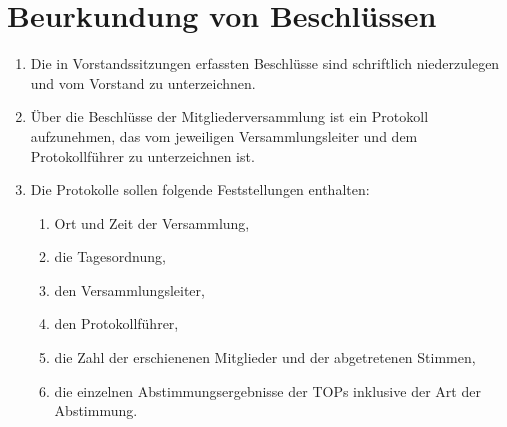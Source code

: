 \documentclass[a4paper,ngerman]{scrartcl}
\begin{document}
\section{Beurkundung von Beschlüssen}
\begin{enumerate}
\item Die in Vorstandssitzungen erfassten Beschlüsse sind schriftlich niederzulegen und vom Vorstand zu unterzeichnen.
\item Über die Beschlüsse der Mitgliederversammlung ist ein Protokoll aufzunehmen, das vom jeweiligen Versammlungsleiter und dem Protokollführer zu unterzeichnen ist. 
\item Die Protokolle sollen folgende Feststellungen enthalten:
\begin{enumerate}
\item Ort und Zeit der Versammlung,
\item die Tagesordnung,
\item den Versammlungsleiter,
\item den Protokollführer,
\item die Zahl der erschienenen Mitglieder und der abgetretenen Stimmen,
\item die einzelnen Abstimmungsergebnisse der TOPs inklusive der Art der Abstimmung.
\end{enumerate}
\end{enumerate}
\end{document}
